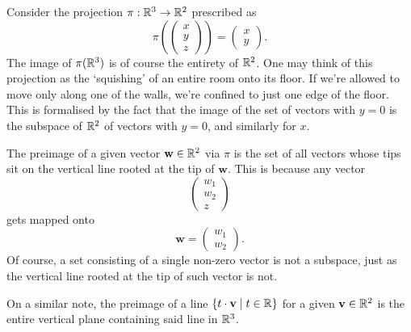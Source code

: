 \begin{example}{}{}
 Consider the projection $\pi:\mathbb{R}^3 \to \mathbb{R}^2$ prescribed as
 \[
  \pi \left( 
  \begin{pmatrix}
   x\\
   y\\
   z
  \end{pmatrix}
  \right) = 
  \begin{pmatrix}
   x\\
   y
  \end{pmatrix}.
 \]
 The image of $\pi(\mathbb{R}^3)$ is of course the entirety of $\mathbb{R}^2$. One may think of
 this projection as the `squishing' of an entire room onto its floor. If we're
 allowed to move only along one of the walls, we're confined to just one edge of
 the floor. This is formalised by the fact that the image of the set of vectors
 with $y = 0$ is the subspace of $\mathbb{R}^2$ of vectors with $y = 0$, and similarly
 for $x$.

 \begin{center}
 \end{center}

 The preimage of a given vector $\mathbf{w} \in \mathbb{R}^2$ via $\pi$ is the set of
 all vectors whose tips sit on the vertical line rooted at the tip of
 $\mathbf{w}$. This is because any vector
 \[
  \begin{pmatrix}
   w_1\\
   w_2\\
   z
  \end{pmatrix}
 \]
 gets mapped onto
 \[
  \mathbf{w} = 
  \begin{pmatrix}
   w_1\\
   w_2
  \end{pmatrix}.
 \]
 Of course, a set consisting of a single non-zero vector is not a subspace, just
 as the vertical line rooted at the tip of such vector is not. 

 On a similar note, the preimage of a line $\{t \cdot \mathbf{v} \mid t \in
 \mathbb{R}\}$ for a given $\mathbf{v} \in \mathbb{R}^2$ is the entire vertical plane containing
 said line in $\mathbb{R}^3$.
\end{example}

